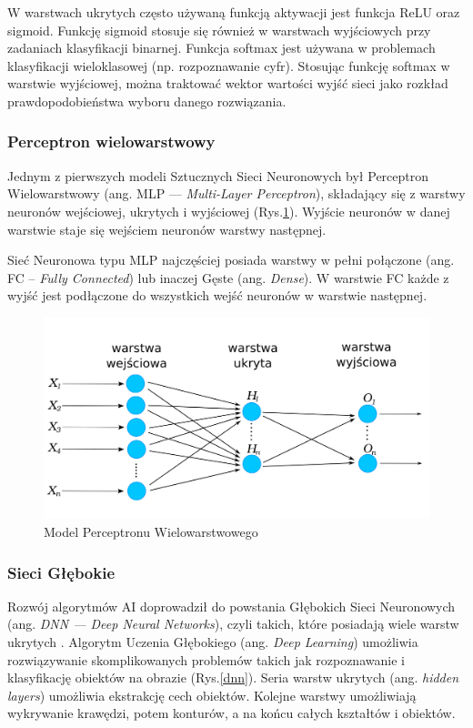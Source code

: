 W warstwach ukrytych często używaną funkcją aktywacji jest funkcja ReLU oraz sigmoid. Funkcję sigmoid stosuje się również w warstwach wyjściowych przy zadaniach klasyfikacji binarnej. Funkcja softmax jest używana w problemach klasyfikacji wieloklasowej (np. rozpoznawanie cyfr). Stosując funkcję softmax w warstwie wyjściowej, można traktować wektor wartości wyjść sieci jako rozkład prawdopodobieństwa wyboru danego rozwiązania.

\subsubsection{Perceptron wielowarstwowy}
Jednym z pierwszych modeli Sztucznych Sieci Neuronowych był Perceptron
Wielowarstwowy (ang. MLP — \emph{Multi-Layer Perceptron}), składający 
się z warstwy neuronów wejściowej, ukrytych i wyjściowej (Rys.\ref{mlp}).
Wyjście neuronów w danej warstwie staje się wejściem neuronów warstwy następnej.

Sieć Neuronowa typu MLP najczęściej posiada warstwy w pełni połączone
(ang. FC -- \emph{Fully Connected}) lub inaczej Gęste (ang. \emph{Dense}). W warstwie FC każde z wyjść jest podłączone do wszystkich wejść neuronów w warstwie następnej.

\begin{figure}[h]
  \centering
  \includegraphics[width=\textwidth]{img/mlp.png}
  \caption{Model Perceptronu Wielowarstwowego}
  \label{mlp}
\end{figure}


\subsubsection{Sieci Głębokie}

Rozwój algorytmów AI doprowadził do powstania Głębokich Sieci Neuronowych (ang. 
\emph{DNN — Deep Neural Networks}), czyli takich, które posiadają wiele 
warstw ukrytych \cite{Goodfellow-et-al-2016}. Algorytm Uczenia Głębokiego (ang. 
\emph{Deep Learning}) umożliwia rozwiązywanie skomplikowanych problemów takich 
jak rozpoznawanie i klasyfikację obiektów na obrazie (Rys.\ref{dnn}). Seria warstw ukrytych (ang. \emph{hidden layers}) umożliwia ekstrakcję cech obiektów. 
Kolejne warstwy umożliwiają wykrywanie krawędzi, potem konturów, a na końcu 
całych kształtów i obiektów.

